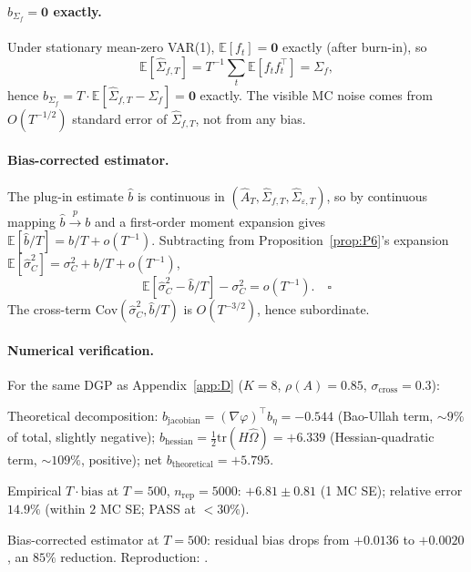 \documentclass[11pt,letterpaper]{article}
\theoremstyle{remark}
\newcommand{\Sigmaf}{\Sigma_f}
\newcommand{\sigC}{\sigma^2_C}
\newcommand{\hatsigC}{\widehat{\sigma}^2_C}
\newcommand{\Ehat}{\widehat{A}}
\newcommand{\trace}{\mathrm{tr}}
\newcommand{\Cov}{\mathrm{Cov}}
\newcommand{\E}{\mathbb{E}}
\begin{document}
\paragraph{$b_{\Sigmaf} = \mathbf{0}$ exactly.} Under stationary mean-zero VAR(1), $\E[f_t] = \mathbf{0}$ exactly (after burn-in), so
\begin{equation*}
\E[\widehat{\Sigma}_{f, T}] = T^{-1} \sum_t \E[f_t f_t^\top] = \Sigmaf,
\end{equation*}
hence $b_{\Sigmaf} = T \cdot \E[\widehat{\Sigma}_{f, T} - \Sigmaf] = \mathbf{0}$ exactly. The visible MC noise comes from $O(T^{-1/2})$ standard error of $\widehat{\Sigma}_{f, T}$, not from any bias.

\paragraph{Bias-corrected estimator.} The plug-in estimate $\widehat{b}$ is continuous in $(\Ehat_T, \widehat{\Sigma}_{f, T}, \widehat{\Sigma}_{\varepsilon, T})$, so by continuous mapping $\widehat{b} \xrightarrow{p} b$ and a first-order moment expansion gives $\E[\widehat{b}/T] = b/T + o(T^{-1})$. Subtracting from Proposition~\ref{prop:P6}'s expansion $\E[\hatsigC] = \sigC + b/T + o(T^{-1})$,
\begin{equation*}
\E[\hatsigC - \widehat{b}/T] - \sigC = o(T^{-1}). \quad \square
\end{equation*}
The cross-term $\Cov(\hatsigC, \widehat{b}/T)$ is $O(T^{-3/2})$, hence subordinate.

\paragraph{Numerical verification.} For the same DGP as Appendix~\ref{app:D} ($K = 8$, $\rho(A) = 0.85$, $\sigma_{\mathrm{cross}} = 0.3$):

Theoretical decomposition: $b_{\mathrm{jacobian}} = (\nabla \varphi)^\top b_\eta = -0.544$ (Bao-Ullah term, $\sim 9\%$ of total, slightly negative); $b_{\mathrm{hessian}} = \tfrac{1}{2} \trace(H \widehat\Omega) = +6.339$ (Hessian-quadratic term, $\sim 109\%$, positive); net $b_{\mathrm{theoretical}} = +5.795$.

Empirical $T \cdot \mathrm{bias}$ at $T = 500$, $n_{\mathrm{rep}} = 5000$: $+6.81 \pm 0.81$ (1 MC SE); relative error $14.9\%$ (within $2$ MC SE; PASS at $< 30\%$).

Bias-corrected estimator at $T = 500$: residual bias drops from $+0.0136$ to $+0.0020$, an $85\%$ reduction. Reproduction: .
\end{document}
